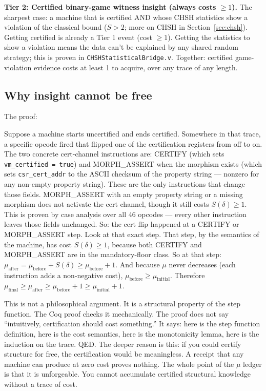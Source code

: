 \documentclass[11pt,a4paper]{article}
\theoremstyle{plain}
\theoremstyle{definition}
\theoremstyle{remark}
\begin{document}
\medskip
\noindent\textbf{Tier 2: Certified binary-game witness insight (always costs $\geq 1$).}
The sharpest case: a machine that is certified AND whose CHSH statistics show a violation of the classical bound ($S > 2$; more on CHSH in Section~\ref{sec:chsh}). Getting certified is already a Tier 1 event (cost $\geq 1$). Getting the statistics to show a violation means the data can't be explained by any shared random strategy; this is proven in \texttt{CHSHStatisticalBridge.v}. Together: certified game-violation evidence costs at least 1 to acquire, over any trace of any length.

\subsection{Why insight cannot be free}

The proof:

Suppose a machine starts uncertified and ends certified. Somewhere in that trace, a specific opcode fired that flipped one of the certification registers from off to on. The two concrete cert-channel instructions are: CERTIFY (which sets \texttt{vm\_certified = true}) and MORPH\_ASSERT when the morphism exists (which sets \texttt{csr\_cert\_addr} to the ASCII checksum of the property string — nonzero for any non-empty property string). These are the only instructions that change those fields. MORPH\_ASSERT with an empty property string or a missing morphism does not activate the cert channel, though it still costs $S(\delta) \geq 1$. This is proven by case analysis over all 46 opcodes --- every other instruction leaves those fields unchanged. So: the cert flip happened at a CERTIFY or MORPH\_ASSERT step. Look at that exact step. That step, by the semantics of the machine, has cost $S(\delta) \geq 1$, because both CERTIFY and MORPH\_ASSERT are in the mandatory-floor class. So at that step: $\mu_{\text{after}} = \mu_{\text{before}} + S(\delta) \geq \mu_{\text{before}} + 1$. And because $\mu$ never decreases (each instruction adds a non-negative cost), $\mu_{\text{before}} \geq \mu_{\text{initial}}$. Therefore $\mu_{\text{final}} \geq \mu_{\text{after}} \geq \mu_{\text{before}} + 1 \geq \mu_{\text{initial}} + 1$.

This is not a philosophical argument. It is a structural property of the step function. The Coq proof checks it mechanically. The proof does not say ``intuitively, certification should cost something.'' It says: here is the step function definition, here is the cost semantics, here is the monotonicity lemma, here is the induction on the trace. QED. The deeper reason is this: if you could certify structure for free, the certification would be meaningless. A receipt that any machine can produce at zero cost proves nothing. The whole point of the $\mu$ ledger is that it is unforgeable. You cannot accumulate certified structural knowledge without a trace of cost.
\end{document}
